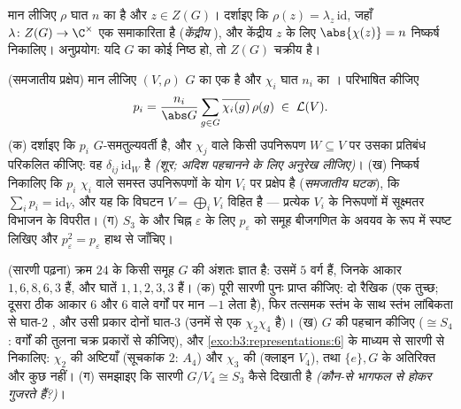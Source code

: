 \begin{exercise}[$\star\star$]\label{exo:b3:representations:10}
मान लीजिए $\rho$ घात $n$ का  है और $z
\in Z(G)$।
दर्शाइए कि $\rho(z) = \lambda_z\,\mathrm{id}$, जहाँ $\lambda \colon Z(G) \to \C^\times$ एक समाकारिता है (\emph{केंद्रीय
}), और केंद्रीय $z$ के लिए $\abs{\chi(z)} = n$ निष्कर्ष निकालिए।
अनुप्रयोग: यदि $G$ का कोई निष्ठ  हो, तो $Z(G)$
चक्रीय है।
\end{exercise}

\begin{exercise}[$\star\star$]\label{exo:b3:representations:11}
(समजातीय प्रक्षेप) मान लीजिए $(V, \rho)$ $G$ का एक  है और
$\chi_i$ घात $n_i$ का  । परिभाषित कीजिए
\[
p_i = \frac{n_i}{\abs G}\sum_{g\in G}
\overline{\chi_i(g)}\,\rho(g) \;\in\; \mathcal L(V).
\]
(क) दर्शाइए कि $p_i$ $G$-समतुल्यवर्ती है, और  $\chi_j$ वाले
किसी  उपनिरूपण $W \subseteq
V$ पर उसका प्रतिबंध परिकलित कीजिए: वह
$\delta_{ij}\,
\mathrm{id}_W$ है \emph{(शूर; अदिश पहचानने के लिए अनुरेख लीजिए)}।
(ख) निष्कर्ष निकालिए कि $p_i$  $\chi_i$ वाले समस्त 
उपनिरूपणों के योग $V_i$ पर प्रक्षेप है (\emph{समजातीय घटक}), कि
$\sum_ip_i =
\mathrm{id}_V$, और यह कि विघटन $V =
\bigoplus_iV_i$ विहित है --- प्रत्येक $V_i$ के
 निरूपणों में सूक्ष्मतर विभाजन के विपरीत।
(ग) $S_3$ के  और चिह्न  $\varepsilon$ के लिए $p_\varepsilon$ को
समूह बीजगणित के अवयव के रूप में स्पष्ट लिखिए और $p_\varepsilon^2
= p_\varepsilon$ हाथ से
जाँचिए।
\end{exercise}

\begin{exercise}[$\star\star$]\label{exo:b3:representations:12}
(सारणी पढ़ना) क्रम $24$ के किसी समूह $G$ की  अंशतः
ज्ञात है: उसमें $5$ वर्ग हैं, जिनके आकार $1, 6, 8, 6, 3$ हैं, और घातें
$1, 1, 2, 3, 3$ हैं।
(क) पूरी सारणी पुनः प्राप्त कीजिए: दो रैखिक  (एक तुच्छ;
दूसरा ठीक आकार $6$ और $6$ वाले वर्गों पर मान $-1$ लेता
है), फिर तत्समक स्तंभ के साथ स्तंभ लांबिकता से घात-$2$ ,
और उसी प्रकार दोनों घात-$3$  (उनमें से एक $\chi_2\chi_4$ है)।
(ख) $G$ की पहचान कीजिए ($\cong S_4$: वर्गों की तुलना चक्र प्रकारों
से कीजिए), और \cref{exo:b3:representations:6} के माध्यम से सारणी से 
निकालिए: $\chi_2$ की अष्टियाँ (सूचकांक $2$: $A_4$) और $\chi_3$ की
(क्लाइन $V_4$), तथा $\{e\}, G$ के अतिरिक्त और कुछ नहीं।
(ग) समझाइए कि सारणी $G/V_4 \cong S_3$ कैसे दिखाती है \emph{(कौन-से 
भागफल से होकर गुजरते हैं?)}।
\end{exercise}

